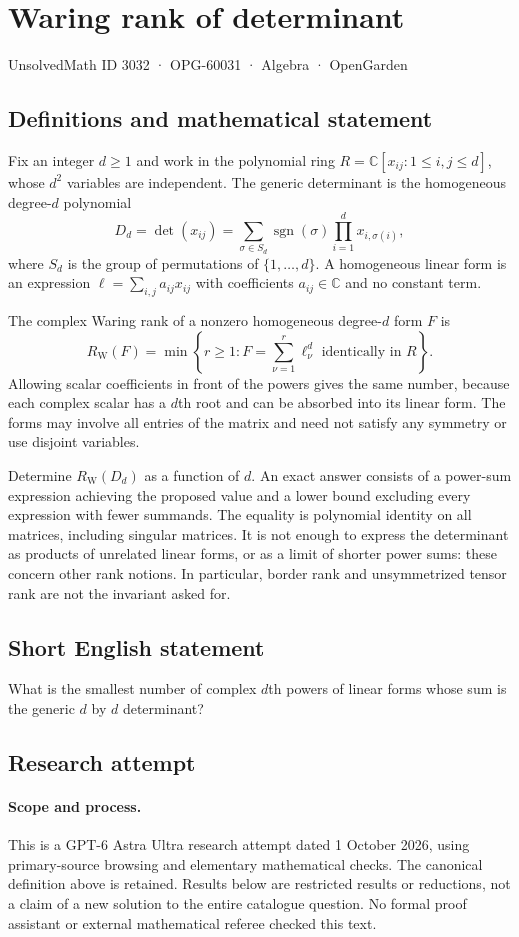 \documentclass[11pt,a4paper]{article}
\begin{document}
\section*{Waring rank of determinant}\label{3032}
{\small UnsolvedMath ID 3032 · OPG-60031 · Algebra · OpenGarden}
\subsection{Definitions and mathematical statement}
Fix an integer $d\ge1$ and work in the polynomial ring
$R=\mathbb C[x_{ij}:1\le i,j\le d]$, whose $d^2$ variables are independent.
The generic determinant is the homogeneous degree-$d$ polynomial
\[
 D_d=\det(x_{ij})=
 \sum_{\sigma\in S_d}\operatorname{sgn}(\sigma)
       \prod_{i=1}^d x_{i,\sigma(i)},
\]
where $S_d$ is the group of permutations of $\{1,\ldots,d\}$.
A homogeneous linear form is an expression
$\ell=\sum_{i,j}a_{ij}x_{ij}$ with coefficients $a_{ij}\in\mathbb C$ and no
constant term.

The complex Waring rank of a nonzero homogeneous degree-$d$ form $F$ is
\[
 R_{\mathrm W}(F)=\min\left\{r\ge1:
 F=\sum_{\nu=1}^r\ell_\nu^d\text{ identically in }R\right\}.
\]
Allowing scalar coefficients in front of the powers gives the same number,
because each complex scalar has a $d$th root and can be absorbed into its
linear form. The forms may involve all entries of the matrix and need not
satisfy any symmetry or use disjoint variables.

Determine $R_{\mathrm W}(D_d)$ as a function of $d$. An exact answer consists
of a power-sum expression achieving the proposed value and a lower bound
excluding every expression with fewer summands. The equality is polynomial
identity on all matrices, including singular matrices. It is not enough to
express the determinant as products of unrelated linear forms, or as a
limit of shorter power sums: these concern other rank notions. In particular,
border rank and unsymmetrized tensor rank are not the invariant asked for.
\subsection{Short English statement}
What is the smallest number of complex $d$th powers of linear forms whose sum is the generic $d$ by $d$ determinant?
\subsection{Research attempt}
\paragraph{Scope and process.}
This is a GPT-6 Astra Ultra research attempt dated 1 October 2026, using
primary-source browsing and elementary mathematical checks. The canonical
definition above is retained. Results below are restricted results or
reductions, not a claim of a new solution to the entire catalogue question.
No formal proof assistant or external mathematical referee checked this text.
\end{document}
